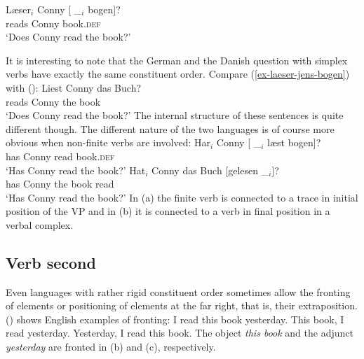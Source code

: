 \ex
\gll Læser$_i$ Conny [ \_$_i$ bogen]?\\
     reads     Conny {}        {}     book.\textsc{def}\\
\glt `Does Conny read the book?'
\zl

It is interesting to note that the German and the Danish question with simplex verbs have exactly
the same constituent order. Compare (\ref{ex-laeser-jens-bogen}) with ():
\ea
\gll Liest Conny das Buch?\\
     reads Conny the book\\ \german
\glt `Does Conny read the book?'
\z
The internal structure of these sentences is quite different though. The different nature of the two
languages is of course more obvious when non-finite verbs are involved:
\eal
\ex
\gll Har$_i$ Conny [ \_$_i$ læst bogen]?\\
     has Conny {} {} read book.\textsc{def}\\\danish
\glt `Has Conny read the book?'
\ex
\gll Hat$_i$ Conny das Buch [gelesen \_$_i$]?\\
     has Conny the book \spacebr{}read\\ \german
\glt `Has Conny read the book?'
\zl
In (a) the finite verb is connected to a trace in initial position of the VP and in
(b) it is connected to a verb in final position in a verbal complex.


\subsection{Verb second}
\label{sce-verb-second}

Even languages with rather rigid constituent order sometimes allow the fronting of elements or
positioning of elements at the far right, that is, their extraposition. () shows English examples of fronting:
\eal
\ex I read this book yesterday.
\ex This book, I read yesterday.
\ex Yesterday, I read this book.
\zl
The object \emph{this book} and the adjunct \emph{yesterday} are fronted in (b) and
(c), respectively.

